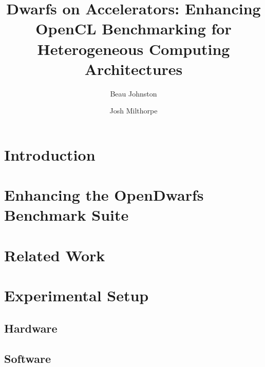 \documentclass[sigconf,preprint,9pt]{acmart}
\begin{document}
\title[Dwarfs on Accelerators]{Dwarfs on Accelerators: Enhancing OpenCL Benchmarking for Heterogeneous Computing Architectures}

\author{Beau Johnston}

\author{Josh Milthorpe}

\begin{abstract}
	
\end{abstract}

\maketitle

\section{Introduction}
\section{Enhancing the OpenDwarfs Benchmark Suite}

\section{Related Work}


\section{Experimental Setup}\label{sec:experimental_setup}
\subsection{Hardware}
\subsection{Software}
\end{document}
